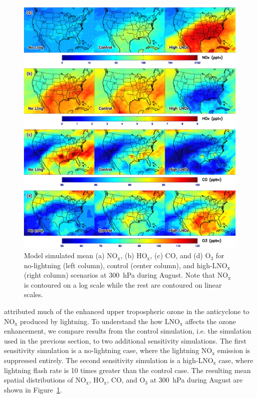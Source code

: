  \begin{figure}
 \noindent\includegraphics[width=40pc]{Figures/ltngsens_map.png}
 \caption[Sensitivity of various species to  at 300~hPa]
{\small Model simulated mean (a) NO$_{\mathrm{x}}$, (b) HO$_{\mathrm{x}}$,
(c) CO, and (d) O$_3$ for no-lightning (left column), control (center
column), and high-LNO$_{\mathrm{x}}$ (right column) scenarios at 300~hPa
during August. Note that NO$_{\mathrm{x}}$ is contoured on a log scale
while the rest are contoured on linear scales.}
 \label{fig:ltng_map}
 \end{figure}

\citet{Cooper:2007cr} attributed much of the enhanced upper tropospheric ozone in the
anticyclone to $\mathrm{NO_x}$ produced by lightning. To understand the how LNO$_{\mathrm{x}}$
affects the ozone enhancement, we compare results from the control simulation, i.e.
the simulation used in the previous section, to two additional sensitivity simulations.
The first sensitivity simulation is a no-lightning case, where the lightning $\mathrm{NO_x}$ emission is suppressed entirely.
The second sensitivity simulation is a high-$\mathrm{LNO_x}$ case, where lightning flash rate is 10 times greater
than the control case. The resulting mean spatial
distributions of NO$_{\mathrm{x}}$, HO$_{\mathrm{x}}$, CO, and O$_3$ at 300~hPa
during August are shown in Figure~\ref{fig:ltng_map}.

